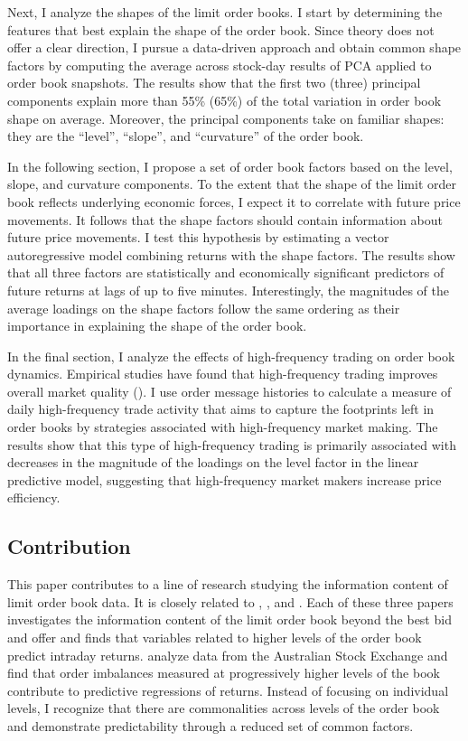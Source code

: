 		Next, I analyze the shapes of the limit order books. I start by determining the features that best explain the shape of the order book. Since theory does not offer a clear direction, I pursue a data-driven approach and obtain common shape factors by computing the average across stock-day results of PCA applied to order book snapshots. The results show that the first two (three) principal components explain more than 55\% (65\%) of the total variation in order book shape on average. Moreover, the principal components take on familiar shapes: they are the ``level'', ``slope'', and ``curvature'' of the order book.

		In the following section, I propose a set of order book factors based on the level, slope, and curvature components. To the extent that the shape of the limit order book reflects underlying economic forces, I expect it to correlate with future price movements. It follows that the shape factors should contain information about future price movements. I test this hypothesis by estimating a vector autoregressive model combining returns with the shape factors. The results show that all three factors are statistically and economically significant predictors of future returns at lags of up to five minutes. Interestingly, the magnitudes of the average loadings on the shape factors follow the same ordering as their importance in explaining the shape of the order book.

		In the final section, I analyze the effects of high-frequency trading on order book dynamics. Empirical studies have found that high-frequency trading improves overall market quality (\citet{Boehmer2014,Hendershott2011,Hagstromer2013,Hasbrouck2013}). I use order message histories to calculate a measure of daily high-frequency trade activity that aims to capture the footprints left in order books by strategies associated with high-frequency market making. The results show that this type of high-frequency trading is primarily associated with decreases in the magnitude of the loadings on the level factor in the linear predictive model, suggesting that high-frequency market makers increase price efficiency.

	\subsection{Contribution}
		This paper contributes to a line of research studying the information content of limit order book data. It is closely related to \citet{Cao2009}, \citet{Yuferova2015}, and \citet{Beltran-Lopez2009}. Each of these three papers investigates the information content of the limit order book beyond the best bid and offer and finds that variables related to higher levels of the order book predict intraday returns. \citet{Cao2009} analyze data from the Australian Stock Exchange and find that order imbalances measured at progressively higher levels of the book contribute to predictive regressions of returns. Instead of focusing on individual levels, I recognize that there are commonalities across levels of the order book and demonstrate predictability through a reduced set of common factors.

